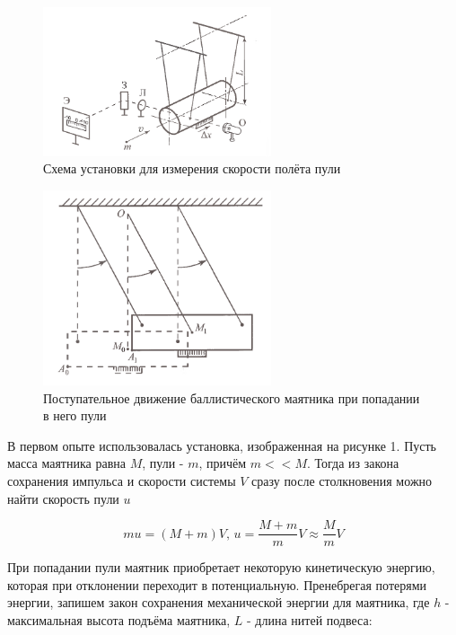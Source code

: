 \documentclass[a4paper,12pt]{article} %
\begin{document}
\begin{figure}[h]
\begin{center}
\includegraphics[width=0.6\textwidth]{prop-1.png}
\end{center}
\label{prop1}
\caption{Схема установки для измерения скорости полёта пули}
\end{figure}

\begin{figure}[h]
\begin{center}
\includegraphics[width=0.6\textwidth]{prop-2.png}
\end{center}
\label{prop2}
\caption{Поступательное движение баллистического маятника при попадании в него пули}
\end{figure}

В первом опыте использовалась установка, изображенная на рисунке 1. Пусть масса маятника равна $M$, пули - $m$, причём $ m << M $. Тогда из закона сохранения импульса и скорости системы $ V $ сразу после столкновения можно найти скорость пули $ u $

\begin{equation}
mu = (M + m)V \text{,  } u = \frac{M + m}{m}V \approx \frac{M}{m}V
\label{impulse}
\end{equation}

При попадании пули маятник приобретает некоторую кинетическую энергию, которая при отклонении переходит в потенциальную. Пренебрегая потерями энергии, запишем закон сохранения механической энергии для маятника, где $ h $ - максимальная высота подъёма маятника, $ L $ - длина нитей подвеса:
\end{document}
